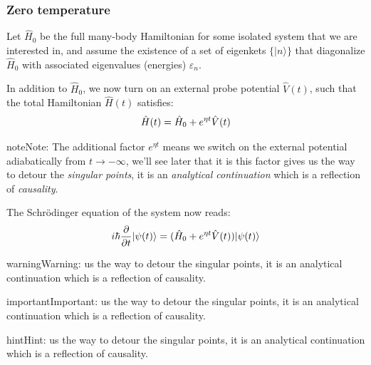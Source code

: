 \documentclass[letterpaper,10pt,english]{sphinxmanual}
\begin{document}
\subsubsection{Zero temperature}
\label{CMP/linear response theory/Kubo_formula:id2}\label{CMP/linear response theory/Kubo_formula:zero-temperature}
Let \(\hat{H}_0\) be the full many-body Hamiltonian for some isolated system that we are interested in, and assume the existence of a set of eigenkets \(\{|n\rangle\}\) that diagonalize \(\hat{H}_0\) with associated
eigenvalues (energies) \(\varepsilon_n\).

In addition to \(\hat{H}_0\), we now turn on an external probe potential \(\hat{V}(t)\), such that the total Hamiltonian \(\hat{H}(t)\) satisfies:
\begin{gather}
\begin{split}\hat{H}(t)=\hat{H}_0+e^{\eta t}\hat{V}(t)\end{split}\notag
\end{gather}
\begin{notice}{note}{Note:}
The additional factor \(e^{\eta t}\) means we switch on the external potential adiabatically from \(t\to -\infty\), we'll see later that it is this factor gives us the way to detour the \emph{singular points}, it is an \emph{analytical continuation} which is a reflection of \emph{causality}.
\end{notice}

The Schr\"{o}dinger equation of the system now reads:
\begin{gather}
\begin{split}i\hbar\frac{\partial}{\partial t}|\psi(t)\rangle=(\hat{H}_0+e^{\eta t}\hat{V}(t))|\psi(t)\rangle\end{split}\notag
\end{gather}
\begin{notice}{warning}{Warning:}
us the way to detour the singular points, it is an analytical continuation which is a reflection of causality.
\end{notice}

\begin{notice}{important}{Important:}
us the way to detour the singular points, it is an analytical continuation which is a reflection of causality.
\end{notice}

\begin{notice}{hint}{Hint:}
us the way to detour the singular points, it is an analytical continuation which is a reflection of causality.
\end{notice}
\end{document}
